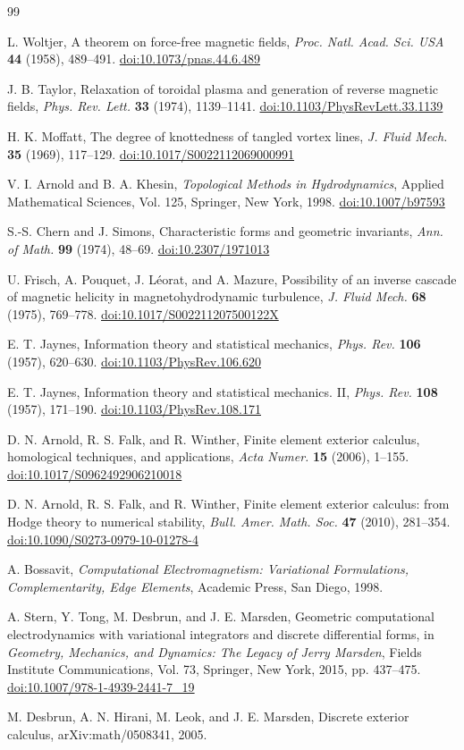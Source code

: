 \documentclass[11pt]{article}
\theoremstyle{definition}
\theoremstyle{remark}
\newcommand{\doi}[1]{\href{https://doi.org/#1}{doi:#1}}
\begin{document}
\begin{thebibliography}{99}

L. Woltjer,
A theorem on force-free magnetic fields,
\emph{Proc. Natl. Acad. Sci. USA}
\textbf{44} (1958), 489--491.
\doi{10.1073/pnas.44.6.489}

J. B. Taylor,
Relaxation of toroidal plasma and generation of reverse
magnetic fields,
\emph{Phys. Rev. Lett.}
\textbf{33} (1974), 1139--1141.
\doi{10.1103/PhysRevLett.33.1139}

H. K. Moffatt,
The degree of knottedness of tangled vortex lines,
\emph{J. Fluid Mech.}
\textbf{35} (1969), 117--129.
\doi{10.1017/S0022112069000991}

V. I. Arnold and B. A. Khesin,
\emph{Topological Methods in Hydrodynamics},
Applied Mathematical Sciences, Vol. 125,
Springer, New York, 1998.
\doi{10.1007/b97593}

S.-S. Chern and J. Simons,
Characteristic forms and geometric invariants,
\emph{Ann. of Math.}
\textbf{99} (1974), 48--69.
\doi{10.2307/1971013}

U. Frisch, A. Pouquet, J. Léorat, and A. Mazure,
Possibility of an inverse cascade of magnetic helicity in
magnetohydrodynamic turbulence,
\emph{J. Fluid Mech.}
\textbf{68} (1975), 769--778.
\doi{10.1017/S002211207500122X}

E. T. Jaynes,
Information theory and statistical mechanics,
\emph{Phys. Rev.}
\textbf{106} (1957), 620--630.
\doi{10.1103/PhysRev.106.620}

E. T. Jaynes,
Information theory and statistical mechanics. II,
\emph{Phys. Rev.}
\textbf{108} (1957), 171--190.
\doi{10.1103/PhysRev.108.171}

D. N. Arnold, R. S. Falk, and R. Winther,
Finite element exterior calculus, homological techniques, and
applications,
\emph{Acta Numer.}
\textbf{15} (2006), 1--155.
\doi{10.1017/S0962492906210018}

D. N. Arnold, R. S. Falk, and R. Winther,
Finite element exterior calculus: from Hodge theory to
numerical stability,
\emph{Bull. Amer. Math. Soc.}
\textbf{47} (2010), 281--354.
\doi{10.1090/S0273-0979-10-01278-4}

A. Bossavit,
\emph{Computational Electromagnetism:
Variational Formulations, Complementarity, Edge Elements},
Academic Press, San Diego, 1998.

A. Stern, Y. Tong, M. Desbrun, and J. E. Marsden,
Geometric computational electrodynamics with variational
integrators and discrete differential forms,
in
\emph{Geometry, Mechanics, and Dynamics:
The Legacy of Jerry Marsden},
Fields Institute Communications, Vol. 73,
Springer, New York, 2015, pp. 437--475.
\doi{10.1007/978-1-4939-2441-7\_19}

M. Desbrun, A. N. Hirani, M. Leok, and J. E. Marsden,
Discrete exterior calculus,
arXiv:math/0508341, 2005.

\end{thebibliography}
\end{document}
